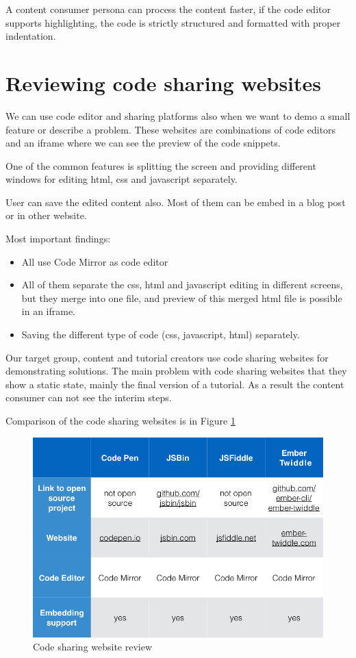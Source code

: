 \documentclass[11pt, a4paper, oneside, openright, medskipamount]{report}
\begin{document}
A content consumer persona can process the content faster, if the code editor supports highlighting, the code is strictly structured and formatted with proper indentation.

\section{Reviewing code sharing websites}

We can use code editor and sharing platforms also when we want to demo a small feature or describe a problem. These websites are combinations of code editors and an iframe where we can see the preview of the code snippets.

One of the common features is splitting the screen and providing different windows for editing html, css and javascript separately.

User can save the edited content also. Most of them can be embed in a blog post or in other website.

\noindent Most important findings:
\begin{itemize}[noitemsep]
\item All use Code Mirror as code editor
\item All of them separate the css, html and javascript editing in different screens, but they merge into one file, and preview of this merged html file is possible in an iframe.
\item Saving the different type of code (css, javascript, html) separately.
\end{itemize}

Our target group, content and tutorial creators use code sharing websites for demonstrating solutions. The main problem with code sharing websites that they show a static state, mainly the final version of a tutorial. As a result the content consumer can not see the interim steps.

Comparison of the code sharing websites is in Figure \ref{fig:code-sharing-website-review}

\begin{figure}[ht]
\centering
\includegraphics[width=1\textwidth]{assets/code-sharing-website-review}
\caption{Code sharing website review}
\label{fig:code-sharing-website-review}
\end{figure}
\end{document}
